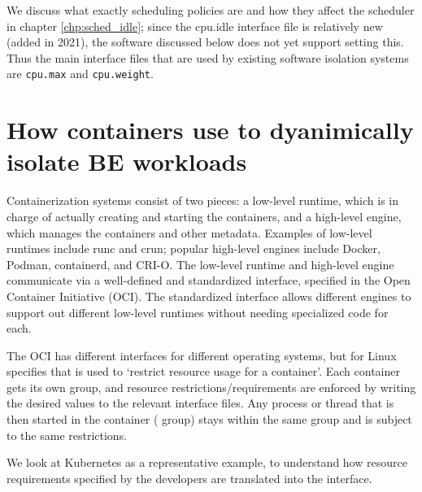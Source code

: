 We discuss what exactly scheduling policies are and how they affect the
scheduler in chapter \ref{chp:sched_idle}; since the cpu.idle \cgroups{}
interface file is relatively new (added in 2021), the software discussed below
does not yet support setting this. Thus the main interface files that are used
by existing software isolation systems are \texttt{cpu.max} and
\texttt{cpu.weight}.

\section{How containers use \cgroups{} to dyanimically isolate BE workloads}

Containerization systems consist of two pieces: a low-level runtime, which is in
charge of actually creating and starting the containers, and a high-level
engine, which manages the containers and other metadata. Examples of low-level
runtimes include runc and crun; popular high-level engines include Docker,
Podman, containerd, and CRI-O. The low-level runtime and high-level engine
communicate via a well-defined and standardized interface, specified in the Open
Container Initiative (OCI). The standardized interface allows different engines
to support out different low-level runtimes without needing specialized code for
each.

The OCI has different interfaces for different operating systems, but for Linux
specifies that \cgroups{} is used to `restrict resource usage for a container'.
Each container gets its own group, and resource restrictions/requirements are
enforced by writing the desired values to the relevant \cgroups{} interface
files. Any process or thread that is then started in the container (\ie{} group)
stays within the same group and is subject to the same restrictions.

We look at Kubernetes as a representative example, to understand how resource
requirements specified by the developers are translated into the \cgroups{}
interface.





